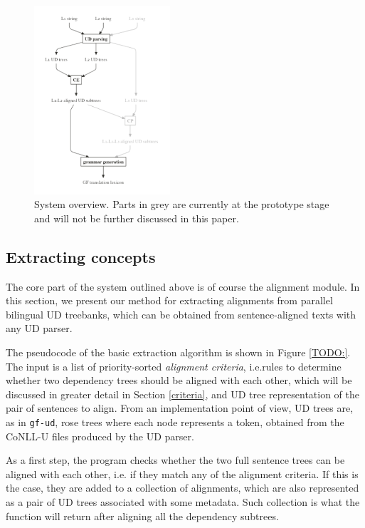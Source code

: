 \documentclass[11pt]{article}
\begin{document}
\begin{figure}[h]
  \centering
  \includegraphics[width=0.45\textwidth]{figures/overview.png}
  \caption[System overview]{System overview. Parts in grey are currently at the prototype stage and will not be further discussed in this paper.} \label{elems}
  \label{overview}
\end{figure}

\subsection{Extracting concepts} 
The core part of the system outlined above is of course the alignment module. In this section, we present our method for extracting alignments from parallel bilingual UD treebanks, which can be obtained from sentence-aligned texts with any UD parser.

The pseudocode of the basic extraction algorithm is shown in Figure \ref{TODO:}.
The input is a list of priority-sorted \textit{alignment criteria}, i.e.rules to determine whether two dependency trees should be aligned with each other, which will be discussed in greater detail in Section \ref{criteria}, and UD tree representation of the pair of sentences to align.
From an implementation point of view, UD trees are, as in \texttt{gf-ud}, rose trees where each node represents a token, obtained from the CoNLL-U files produced by the UD parser.


As a first step, the program checks whether the two full sentence trees can be aligned with each other, i.e. if they match any of the alignment criteria. 
If this is the case, they are added to a collection of alignments, which are also represented as a pair of UD trees associated with some metadata. 
Such collection is what the function will return after aligning all the dependency subtrees. %
\end{document}
